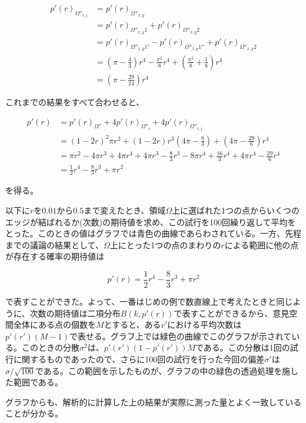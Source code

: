 \begin{align}
p'(r)_{\Omega''_{i,j}} &= p'(r)_{\Omega''_{x, y}}\nonumber \\
&= p'(r)_{\Omega''_{x, y}1}  +p'(r)_{\Omega''_{x, y}2}\nonumber \\
&= p'(r)_{\Omega''_{x, y}1'} - p'(r)_{\Omega''_{x, y}1''} + p'(r)_{\Omega''_{x, y}2}\nonumber \\
&= \left(\pi -\frac{4}{3}\right)r^{4} - \frac{\pi^{2}}{8}r^{4} + \left( \frac{\pi^{2}}{8} + \frac{1}{8} \right)r^{4}\nonumber \\
&= \left(\pi -\frac{29}{24}\right)r^{4}
\end{align}

これまでの結果をすべて合わせると、

\begin{align}
p'(r) &= p'(r)_{\Omega''} + 4p'(r)_{\Omega''_{i}} + 4p'(r)_{\Omega''_{i,j}}\nonumber \\
&= (1-2r)^{2}\pi r^{2} + (1-2r)r^{3}\left( 4\pi-\frac{8}{3} \right) + \left(4\pi -\frac{29}{6}\right)r^{4}\nonumber \\
&= \pi r^{2} - 4\pi r^{3} + 4\pi r^{4} + 4\pi r^{3} -\frac{8}{3}r^{3} - 8\pi r^{4} + \frac{16}{3}r^{4} + 4\pi r^{4} - \frac{29}{6}r^{4}\nonumber \\
&= \frac{1}{2}r^{4} -\frac{8}{3}r^{3} + \pi r^{2}
\end{align}

を得る。

以下に$r$を$0.01$から$0.5$まで変えたとき、領域$\Omega$上に選ばれた1つの点からいくつのエッジが結ばれるか(次数)の期待値を求め、この試行を100回繰り返して平均をとった。このときの値はグラフでは青色の曲線であらわされている。一方、先程までの議論の結果として、$\Omega$上にとった1つの点のまわりの$r$による範囲に他の点が存在する確率の期待値は

$$p'(r) = \frac{1}{2}r^{4} -\frac{8}{3}r^{3} + \pi r^{2}$$

で表すことができた。よって、一番はじめの例で数直線上で考えたときと同じように、次数の期待値は二項分布$B(k,p'(r))$で表すことができるから、意見空間全体にある点の個数を$M$とすると、ある$r'$における平均次数は$p'(r')(M-1)$で表せる。グラフ上では緑色の曲線でこのグラフが示されている。このときの分散$\sigma^{2}$は、$p'(r')(1-p'(r'))M$である。この分散は1回の試行に関するものであったので、さらに100回の試行を行った今回の偏差$\sigma'$は$\sigma/\sqrt{100}$である。この範囲を示したものが、グラフの中の緑色の透過処理を施した範囲である。

グラフからも、解析的に計算した上の結果が実際に測った量とよく一致していることが分かる。

